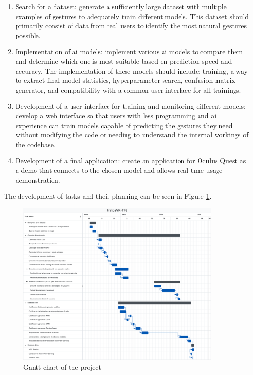 \begin{enumerate}
	\item Search for a dataset: generate a sufficiently large dataset with multiple examples of gestures to adequately train different models. This dataset should primarily consist of data from real users to identify the most natural gestures possible.
	\item Implementation of \gls{ai} models: implement various \gls{ai} models to compare them and determine which one is most suitable based on prediction speed and accuracy. The implementation of these models should include: training, a way to extract final model statistics, hyperparameter search, confusion matrix generator, and compatibility with a common user interface for all trainings.
	\item Development of a user interface for training and monitoring different models: develop a web interface so that users with less programming and \gls{ai} experience can train models capable of predicting the gestures they need without modifying the code or needing to understand the internal workings of the codebase.
	\item Development of a final application: create an application for Oculus Quest as a demo that connects to the chosen model and allows real-time usage demonstration.
\end{enumerate}

The development of tasks and their planning can be seen in Figure \ref{fig:diagrama-gantt-eng}.

\begin{figure}[H]
	\centering
	\includegraphics[width=0.91\textwidth]{Imagenes/Vectorial/Diagrama-gannt.pdf}
	\caption{Gantt chart of the project}
	\label{fig:diagrama-gantt-eng}
\end{figure}